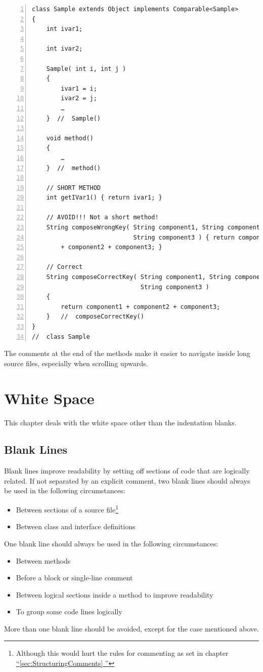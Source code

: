 \documentclass[12pt,a4paper,titlepage, parskip=half, headsepline, footsepline, cleardoubleplain]{scrbook}
\newcommand*{\tqfullref}[1]{\hyperref[{#1}]{“\ref*{#1} \nameref*{#1}”}}
\begin{document}
\begin{lstlisting}[numbers=left]
class Sample extends Object implements Comparable<Sample>
{
    int ivar1;
    
    int ivar2;
    
    Sample( int i, int j ) 
    {
        ivar1 = i;
        ivar2 = j;
        …
    }  //  Sample()
    
    void method()
    {
        …
    }  //  method()
    
    // SHORT METHOD
    int getIVar1() { return ivar1; }
    
    // AVOID!!! Not a short method!
    String composeWrongKey( String component1, String component2,
                            String component3 ) { return component1
        + component2 + component3; }
        
    // Correct
    String composeCorrectKey( String component1, String component2,
                              String component3 )
    {
        return component1 + component2 + component3;
    }   //  composeCorrectKey()
}
//  class Sample
\end{lstlisting}

The comments at the end of the methods make it easier to navigate inside long source files, especially when scrolling upwards.

\section{White Space}
This chapter deals with the white space other than the indentation blanks.

\subsection{Blank Lines}\label{sec:BlankLines}
Blank lines improve readability by setting off sections of code that are logically related.
If not separated by an explicit comment, two blank lines should always be used in the following circumstances:
\begin{itemize}
\item{Between sections of a source file\footnote{Although this would hurt the rules for commenting as set in chapter \tqfullref{sec:StructuringComments}}}
\item{Between class and interface definitions}
\end{itemize}

One blank line should always be used in the following circumstances:
\begin{itemize}
\item{Between methods}
\item{Before a block or single-line comment}
\item{Between logical sections inside a method to improve readability}
\item{To group some code lines logically}
\end{itemize}
More than one blank line should be avoided, except for the case mentioned above.
\end{document}
